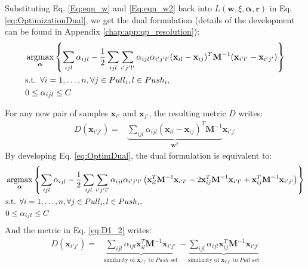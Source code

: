 \noindent Substituting Eq. \ref{Eq:eqn_w} and \ref{Eq:eqn_w2} back into $L(\textbf{w},\xi,\boldsymbol{\alpha},\textbf{r})$ in Eq. \ref{eq:OptimizationDual}, we get the dual formulation (details of the development can be found in Appendix \ref{chap:app:qp_resolution}):
\begin{equation}
	\begin{aligned}
	&\displaystyle \argmax_{\boldsymbol{\alpha}} \left\lbrace 
	\sum\limits_{ijl} \alpha_{ijl} 
	- \frac{1}{2} \sum\limits_{ijl} \sum\limits_{i'j'l'}
	\alpha_{ijl} \alpha_{i'j'l'}
	(\textbf{x}_{il}-\textbf{x}_{ij})^T
	\textbf{M}^{-1}
	(\textbf{x}_{i'l'}-\textbf{x}_{i'j'}) \right\rbrace \\
	&\text{s.t.  } \forall i = 1, \ldots, n, \forall j \in Pull_i, l \in Push_i, \\
	& 0 \leq \alpha_{ijl} \leq C
	\end{aligned}
	\label{eq:OptimDual}
\end{equation}


\noindent For any new pair of samples $\textbf{x}_{i'}$ and $\textbf{x}_{j'}$, the resulting metric $D$ writes: 
\begin{align}
	D(\textbf{x}_{i'j'}) = & 
	\underbrace{
		\sum\limits_{ijl} \alpha_{ijl} 
		(\textbf{x}_{il}-\textbf{x}_{ij})^T
		\textbf{M}^{-1}
	}_{\textbf{w}^T}
	\textbf{x}_{i'j'}
	\label{eq:D1_2}
\end{align}
By developing Eq. \ref{eq:OptimDual}, the dual formulation is equivalent to:
\begin{equation}
\begin{aligned}
&\displaystyle \argmax_{\boldsymbol{\alpha}} \left\lbrace 
\sum\limits_{ijl} \alpha_{ijl} 
- \frac{1}{2} 
	\sum\limits_{ijl} \sum\limits_{i'j'l'}
		\alpha_{ijl} \alpha_{i'j'l'}
		\left( \textbf{x}_{il}^T\textbf{M}^{-1}\textbf{x}_{i'l'}
		-2\textbf{x}_{ij}^T\textbf{M}^{-1}\textbf{x}_{i'l'}
		+\textbf{x}_{ij}^T\textbf{M}^{-1}\textbf{x}_{i'j'}
		\right)  \right\rbrace \\
&\text{s.t.  } \forall i = 1, \ldots, n, \forall j \in Pull_i, l \in Push_i, \\
& 0 \leq \alpha_{ijl} \leq C
\end{aligned}
\label{eq:OptimDual2}
\end{equation}
\noindent And the metric in Eq. \ref{eq:D1_2} writes:
\begin{align}
		D(\textbf{x}_{i'j'}) = & 
		\underbrace{
			\sum\limits_{ijl} \alpha_{ijl} 
			\textbf{x}_{il}^T \textbf{M}^{-1}	\textbf{x}_{i'j'}
		}_{\text{similarity of $\textbf{x}_{i'j'}$ to $Push$ set}}
		- 
		\underbrace{
			\sum\limits_{ijl} \alpha_{ijl} 
			\textbf{x}_{ij}^T \textbf{M}^{-1}	\textbf{x}_{i'j'}
		}_{\text{similarity of $\textbf{x}_{i'j'}$ to $Pull$ set}}
		\label{eq:D1_3}	
\end{align}


